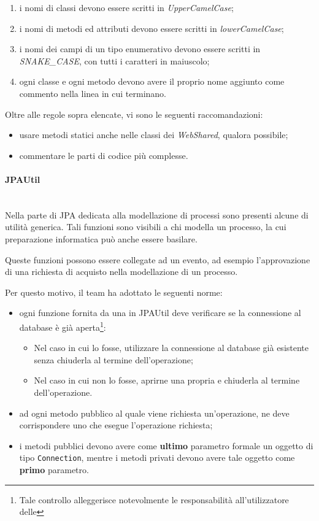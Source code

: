 \begin{itemize}
\begin{enumerate}
		\item i nomi di classi devono essere scritti in \emph{UpperCamelCase};
		\item i nomi di metodi ed attributi devono essere scritti in
		\emph{lowerCamelCase};
		\item i nomi dei campi di un tipo enumerativo devono essere scritti in
		\emph{SNAKE\_CASE}, con tutti i caratteri in maiuscolo;
		\item ogni classe e ogni metodo devono avere il proprio nome aggiunto come
		commento nella linea in cui terminano.
	\end{enumerate}
\end{itemize}

Oltre alle regole sopra elencate, vi sono le seguenti raccomandazioni:

\begin{itemize}
	\item usare metodi statici anche nelle classi dei \emph{WebShared}, qualora
	possibile;
	\item commentare le parti di codice più complesse.
\end{itemize}

\paragraph{JPAUtil} \mbox{} \\

Nella parte di JPA dedicata alla modellazione di processi sono presenti
alcune  di utilità generica. Tali funzioni sono visibili a chi modella
un processo, la cui preparazione informatica può anche essere basilare.

Queste funzioni possono essere collegate ad un evento, ad esempio
l'approvazione di una richiesta di acquisto nella modellazione di un processo.

Per questo motivo, il team ha adottato le seguenti norme:

\begin{itemize}
	\item ogni funzione fornita da una  in JPAUtil deve verificare se
	la connessione al database è già aperta\footnote{Tale controllo alleggerisce
	notevolmente le responsabilità all'utilizzatore delle }:
	\begin{itemize}
		\item Nel caso in cui lo fosse, utilizzare la connessione al database già
		esistente senza chiuderla al termine dell'operazione;
		\item Nel caso in cui non lo fosse, aprirne una propria e chiuderla al
		termine dell'operazione.
	\end{itemize}
	\item ad ogni metodo pubblico al quale viene richiesta un'operazione, ne deve
	corrispondere uno che esegue l'operazione richiesta;
	\item i metodi pubblici devono avere come \textbf{ultimo} parametro formale
	un oggetto di tipo \texttt{Connection}, mentre i metodi privati devono avere
	tale oggetto come \textbf{primo} parametro.
\end{itemize}

